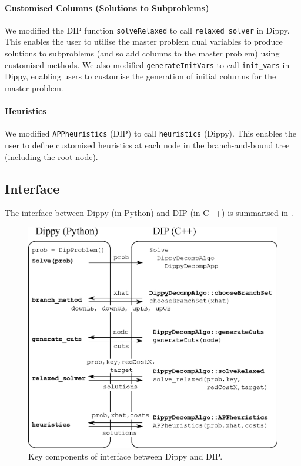 \begin{sloppypar}\paragraph{Customised Columns (Solutions to Subproblems)}
We modified the \ac{DIP} function \lstinline{solveRelaxed} to call \lstinline{relaxed_solver} in Dippy.
This enables the user to utilise the master problem dual variables to produce solutions to subproblems (and so add columns to the master problem) using customised methods.
We also modified \lstinline{generateInitVars} to call \lstinline{init_vars} in Dippy, enabling users to customise the generation of initial columns for the master problem.\end{sloppypar}

\begin{sloppypar}\paragraph{Heuristics}
We modified \lstinline{APPheuristics} (\ac{DIP}) to call \lstinline{heuristics} (Dippy).
This enables the user to define customised heuristics at each node in the branch-and-bound tree (including the root node).\end{sloppypar}

\subsection{Interface}

The interface between Dippy (in Python) and DIP (in C++) is summarised in .
\begin{figure}[htp]
\includegraphics[scale=0.70]{img/diagram.eps}
\caption{Key components of interface between Dippy and DIP.} \label{fig:interface}
\end{figure}

